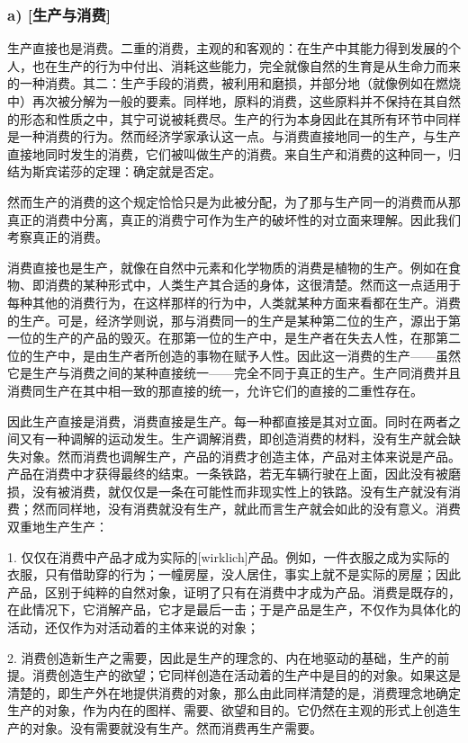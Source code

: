 \documentclass[a4paper,twoside,12pt]{ctexart}
\begin{document}
\subsubsection{a) [生产与消费]}

生产直接也是消费。二重的消费，主观的和客观的：在生产中其能力得到发展的个人，也在生产的行为中付出、消耗这些能力，完全就像自然的生育是从生命力而来的一种消费。其二：生产手段的消费，被利用和磨损，并部分地（就像例如在燃烧中）再次被分解为一般的要素。同样地，原料的消费，这些原料并不保持在其自然的形态和性质之中，其宁可说被耗费尽。生产的行为本身因此在其所有环节中同样是一种消费的行为。然而经济学家承认这一点。与消费直接地同一的生产，与生产直接地同时发生的消费，它们被叫做生产的消费。来自生产和消费的这种同一，归结为斯宾诺莎的定理：确定就是否定。

然而生产的消费的这个规定恰恰只是为此被分配，为了那与生产同一的消费而从那真正的消费中分离，真正的消费宁可作为生产的破坏性的对立面来理解。因此我们考察真正的消费。

消费直接也是生产，就像在自然中元素和化学物质的消费是植物的生产。例如在食物、即消费的某种形式中，人类生产其合适的身体，这很清楚。然而这一点适用于每种其他的消费行为，在这样那样的行为中，人类就某种方面来看都在生产。消费的生产。可是，经济学则说，那与消费同一的生产是某种第二位的生产，源出于第一位的生产的产品的毁灭。在那第一位的生产中，是生产者在失去人性，在那第二位的生产中，是由生产者所创造的事物在赋予人性。因此这一消费的生产——虽然它是生产与消费之间的某种直接统一——完全不同于真正的生产。生产同消费并且消费同生产在其中相一致的那直接的统一，允许它们的直接的二重性存在。

因此生产直接是消费，消费直接是生产。每一种都直接是其对立面。同时在两者之间又有一种调解的运动发生。生产调解消费，即创造消费的材料，没有生产就会缺失对象。然而消费也调解生产，产品的消费才创造主体，产品对主体来说是产品。产品在消费中才获得最终的结束。一条铁路，若无车辆行驶在上面，因此没有被磨损，没有被消费，就仅仅是一条在可能性而非现实性上的铁路。没有生产就没有消费；然而同样地，没有消费就没有生产，就此而言生产就会如此的没有意义。消费双重地生产生产：

1. 仅仅在消费中产品才成为实际的[wirklich]产品。例如，一件衣服之成为实际的衣服，只有借助穿的行为；一幢房屋，没人居住，事实上就不是实际的房屋；因此产品，区别于纯粹的自然对象，证明了只有在消费中才成为产品。消费是既存的，在此情况下，它消解产品，它才是最后一击；于是产品是生产，不仅作为具体化的活动，还仅作为对活动着的主体来说的对象；

2. 消费创造新生产之需要，因此是生产的理念的、内在地驱动的基础，生产的前提。消费创造生产的欲望；它同样创造在活动着的生产中是目的的对象。如果这是清楚的，即生产外在地提供消费的对象，那么由此同样清楚的是，消费理念地确定生产的对象，作为内在的图样、需要、欲望和目的。它仍然在主观的形式上创造生产的对象。没有需要就没有生产。然而消费再生产需要。
\end{document}

